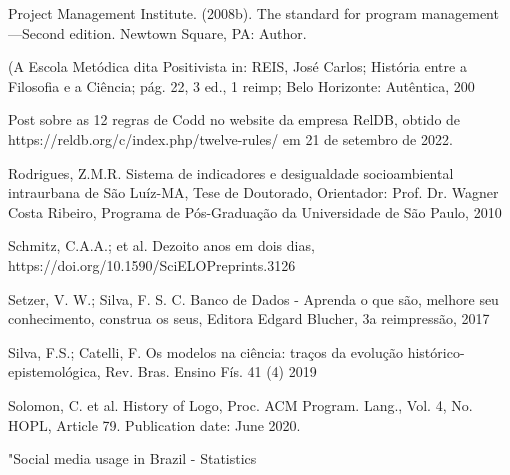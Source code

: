 \begin{flushleft}
[PMI, 2008] Project Management Institute. (2008b). The standard for program management—Second edition. Newtown Square, PA: Author.
\end{flushleft}


\begin{flushleft}
[REIS , 2006] (A Escola Metódica dita Positivista in: REIS, José Carlos; História entre a Filosofia e a Ciência; pág. 22, 3 ed., 1 reimp; Belo Horizonte: Autêntica, 200
\end{flushleft}


\begin{flushleft}
[RelDB, 2019] Post sobre as 12 regras de Codd no website da empresa RelDB, obtido de https://reldb.org/c/index.php/twelve-rules/ em 21 de setembro de 2022.
\end{flushleft}


\begin{flushleft}
[RODRIGUES, 2010] Rodrigues, Z.M.R. Sistema de indicadores e desigualdade socioambiental intraurbana de São Luíz-MA, Tese de Doutorado, Orientador: Prof. Dr. Wagner Costa Ribeiro, Programa de Pós-Graduação da Universidade de São Paulo, 2010
\end{flushleft}


\begin{flushleft}
[SCHMITZ et al., 2021] Schmitz, C.A.A.; et al. Dezoito anos em dois dias, https://doi.org/10.1590/SciELOPreprints.3126
\end{flushleft}


\begin{flushleft}
 Setzer, V. W.; Silva, F. S. C. Banco de Dados - Aprenda o que são, melhore seu conhecimento, construa os seus, Editora Edgard Blucher, 3a reimpressão, 2017
\end{flushleft}


\begin{flushleft}
 Silva, F.S.; Catelli, F. Os modelos na ciência: traços da evolução histórico-epistemológica,  Rev. Bras. Ensino Fís. 41 (4) 2019
\end{flushleft}


\begin{flushleft}
[SOLOMON et al., 2020] Solomon, C. et al. History of Logo, Proc. ACM Program. Lang., Vol. 4, No. HOPL, Article 79. Publication date: June 2020.
\end{flushleft}


\begin{flushleft}
[STATISTA, 2022] "Social media usage in Brazil - Statistics 
\end{flushleft}


